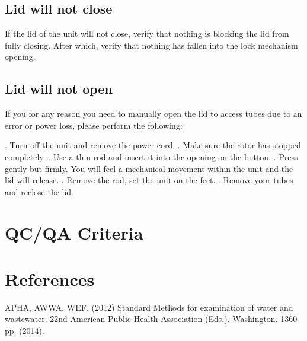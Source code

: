 \documentclass[12pt]{../SOP3_beta}
\begin{document}
\subsection*{Lid will not close}

\NP If the lid of the unit will not close, verify that nothing is blocking the lid from fully closing. After which, verify that nothing has fallen into the lock mechanism opening. 

\subsection*{Lid will not open}

\NP If you for any reason you need to manually open the lid to access tubes due to an error or power loss, please perform the following:

. Turn off the unit and remove the power cord.
. Make sure the rotor has stopped completely.
. Use a thin rod and insert it into the opening on the button.
. Press gently but firmly. You will feel a mechanical movement within the unit and the lid will release.
. Remove the rod, set the unit on the feet.
. Remove your tubes and reclose the lid. 

\section{QC/QA Criteria}

\section{References}

\NP APHA, AWWA. WEF. (2012) Standard Methods for examination of water and wastewater. 22nd American Public Health Association (Eds.). Washington. 1360 pp. (2014).
\end{document}
